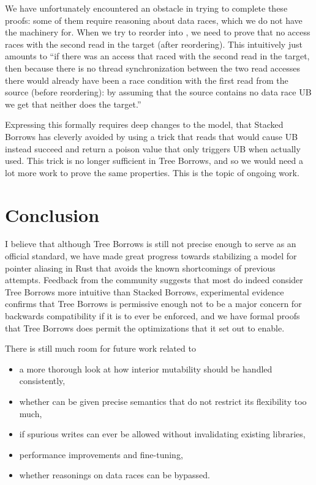 \documentclass[a4paper,11pt]{article}
\theoremstyle{plain}
\theoremstyle{definition}
\theoremstyle{remark}
\newcommand{\tcode}[1]{\rstinline{#1}}
\begin{document}
We have unfortunately encountered an obstacle in trying to complete these proofs: some of them require
reasoning about data races, which we do not have the machinery for.
When we try to reorder \tcode{read(x); call(); read(x)} into \tcode{read(x); read(x); call()}, we need
to prove that no access races with the second read in the target (after reordering). This intuitively
just amounts to ``if there was an access that raced with the second read in the target, then because
there is no thread synchronization between the two read accesses there would already have been a race
condition with the first read from the source (before reordering): by assuming that the source
contains no data race UB we get that neither does the target.''

Expressing this formally requires deep changes to the model, that Stacked Borrows has cleverly avoided
by using a trick that reads that would cause UB instead succeed and return a poison value that only
triggers UB when actually used. This trick is no longer sufficient in Tree Borrows, and so we would
need a lot more work to prove the same properties. This is the topic of ongoing work.


\section{Conclusion}

I believe that although Tree Borrows is still not precise enough to serve as an official standard,
we have made great progress towards stabilizing a model for pointer aliasing in Rust that avoids
the known shortcomings of previous attempts. Feedback from the community suggests that most do indeed
consider Tree Borrows more intuitive than Stacked Borrows, experimental evidence confirms that
Tree Borrows is permissive enough not to be a major concern for backwards compatibility if it is
to ever be enforced, and we have formal proofs that Tree Borrows does permit the optimizations
that it set out to enable.

There is still much room for future work related to
\begin{itemize}
    \item a more thorough look at how interior mutability should be handled consistently,
    \item whether \tcode{core::ptr::Unique} can be given precise semantics that do not restrict
        its flexibility too much,
    \item if spurious writes can ever be allowed without invalidating existing libraries,
    \item performance improvements and fine-tuning,
    \item whether reasonings on data races can be bypassed.
\end{itemize}
\end{document}
